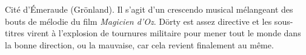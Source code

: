 \documentclass[a4paper]{article}
\newcommand{\mshrule}{}
\begin{document}
Cité d'Émeraude (Grönland). Il s'agit d'un crescendo musical mélangeant
des bouts de mélodie du film \emph{Magicien d'Oz}. Dörty est assez directive
et les sous-titres virent à l’explosion de tournures militaire pour mener
tout le monde dans la bonne direction, ou la mauvaise, car cela revient
finalement au même.
\begin{comment}
\\\hfill\\
\mshrule
\subsection*{Dörty}
\begin{center}
\begin{tabular}{|p{0.3\textwidth}|p{0.3\textwidth}|p{0.3\textwidth}|}\hline
Frizn (parlé) & Français (sous-titres) & Anglais (sous-titres) \\\hline
Sit by, Ttö? &
Regarde l'arc-en-ciel, Toto. Il brille de mille feux multicolores. Ici, tout est si
plat, si laid, si vieux, si gris, si terne, enfin inqualifiable par des
mots. Ressens-tu cela, Toto~?! Toi, un pauvre chien, sans capacités
affectives. Un jour, on ira là-haut ensemble~!! &
That's a rainbow.  We should probably go there.\\\hline
\end{tabular}
\end{center}\par
\subsection*{Ttö}
\begin{center}
\begin{tabular}{|p{0.3\textwidth}|p{0.3\textwidth}|p{0.3\textwidth}|}\hline
Frizn (parlé) & Français (sous-titres) & Anglais (sous-titres) \\\hline
Ttö lick sit grön\-pysin\-blad\-utsid\-smal\-fårs\-klmb\-sperm\-lo\-svit\-fårs\-gry\-plant\-qvik\-fårs\-anorexik\-sizr\-fårs\-fart\-fårs\-\_\-fårs\-fårs?
&
J'aime l'herbe~!!&
I like grass.\\\hline
\end{tabular}
\end{center}\par
\subsection*{Dörty}
\begin{center}
\begin{tabular}{|p{0.3\textwidth}|p{0.3\textwidth}|p{0.3\textwidth}|}\hline
Frizn (parlé) & Français (sous-titres) & Anglais (sous-titres) \\\hline
Chhhhh? &
Idiot. &
I love you.\\\hline
\end{tabular}
\end{center}\hfill\\
\mshrule
\end{comment}
\end{document}
